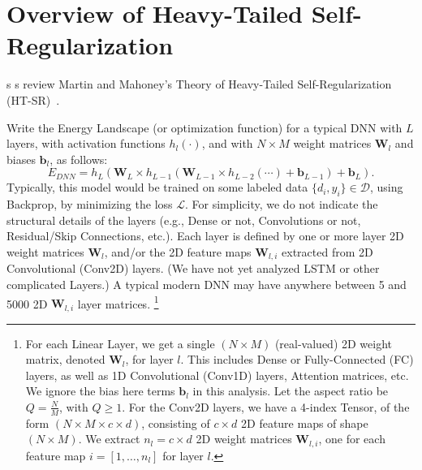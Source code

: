 
\section{Overview of Heavy-Tailed Self-Regularization}
\label{sxn:theory-review}

s s review Martin and Mahoney's Theory of Heavy-Tailed Self-Regularization (HT-SR)~\cite{MM18_TR}.

Write the Energy Landscape (or optimization function) for a typical DNN with $L$ layers, with activation functions $h_{l}(\cdot)$, and with $N\times M$ weight matrices $\mathbf{W}_{l}$ and biases $\mathbf{b}_{l}$, as follows:
\begin{equation}
E_{DNN}=h_{L}(\mathbf{W}_{L}\times h_{L-1}(\mathbf{W}_{L-1}\times h_{L-2}(\cdots)+\mathbf{b}_{L-1})+\mathbf{b}_{L})  .
\label{eqn:dnn_energy}
\end{equation}
Typically, this model would be trained on some labeled data $\{d_{i},y_{i}\}\in\mathcal{D}$, using Backprop, by minimizing the loss $\mathcal{L}$.
For simplicity, we do not indicate the structural details of the layers (e.g., Dense or not, Convolutions or not, Residual/Skip Connections, etc.). 
Each layer is defined by one or more layer 2D weight matrices $\mathbf{W}_{l}$, and/or the 2D feature maps $\mathbf{W}_{l,i}$ extracted from 2D Convolutional (Conv2D) layers.
(We have not yet analyzed LSTM or other complicated Layers.) 
A typical modern DNN may have anywhere between 5 and 5000 2D $\mathbf{W}_{l,i}$ layer matrices.%
\footnote{%
For each Linear Layer, we get a  single $(N\times M)$ (real-valued) 2D weight matrix, denoted $\mathbf{W}_{l}$, for layer $l$.  
This includes Dense or Fully-Connected (FC) layers, as well as 1D Convolutional (Conv1D) layers, Attention matrices, etc.
We ignore the bias here terms $\mathbf{b}_{l}$ in this analysis. 
Let the aspect ratio be $Q=\frac{N}{M}$, with $Q\ge 1$.
For the Conv2D layers, we have a 4-index Tensor, of the form $(N\times M \times c\times d)$, consisting
of $c\times d$ 2D feature maps of shape $(N\times M)$.    
We  extract $n_{l}=c\times d$ 2D weight matrices $\mathbf{W}_{l,i}$, one for each feature map $i=[1,\dots,n_{l}]$ for layer $l$.
}
   

